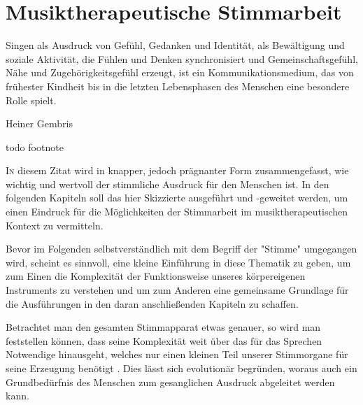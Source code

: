 
\chapter{Musiktherapeutische Stimmarbeit}
\label{chapter:musiktherapeutische_stimmarbeit}
\setlength{\epigraphwidth}{8.0cm}
\epigraph{Singen als Ausdruck von Gefühl, Gedanken und Identität, als Bewältigung und soziale Aktivität, die Fühlen und Denken synchronisiert und Gemeinschaftsgefühl, Nähe und Zugehörigkeitsgefühl erzeugt, ist ein Kommunikationsmedium, das von frühester Kindheit bis in die letzten Lebensphasen des Menschen eine besondere Rolle spielt.}{Heiner Gembris \autocite[12]{gembris2008}} todo footnote
\ifpdf
    \graphicspath{{3_musiktherapeutische_stimmarbeit/figures/PNG/}{3_musiktherapeutische_stimmarbeit/figures/PDF/}{3_musiktherapeutische_stimmarbeit/figures/}}
\else
    \graphicspath{{3_musiktherapeutische_stimmarbeit/figures/EPS/}{3_musiktherapeutische_stimmarbeit/figures/}}
\fi
\lettrine{I}{n} diesem Zitat wird in knapper, jedoch prägnanter Form zusammengefasst, wie wichtig und wertvoll der stimmliche Ausdruck für den Menschen ist. In den folgenden Kapiteln soll das hier Skizzierte ausgeführt und -geweitet werden, um einen Eindruck für die Möglichkeiten der Stimmarbeit im musiktherapeutischen Kontext zu vermitteln.

Bevor im Folgenden selbstverständlich mit dem Begriff der "Stimme" umgegangen wird, scheint es sinnvoll, eine kleine Einführung in diese Thematik zu geben, um zum Einen die Komplexität der Funktionsweise unseres körpereigenen Instruments zu verstehen und um zum Anderen eine gemeinsame Grundlage für die Ausführungen in den daran anschließenden Kapiteln zu schaffen. 

Betrachtet man den gesamten Stimmapparat etwas genauer, so wird man feststellen können, dass seine Komplexität weit über das für das Sprechen Notwendige hinausgeht, welches nur einen kleinen Teil unserer Stimmorgane für seine Erzeugung benötigt \autocite[vgl.][38]{cramer1998}. Dies lässt sich evolutionär begründen, woraus auch ein Grundbedürfnis des Menschen zum gesanglichen Ausdruck abgeleitet werden kann.

